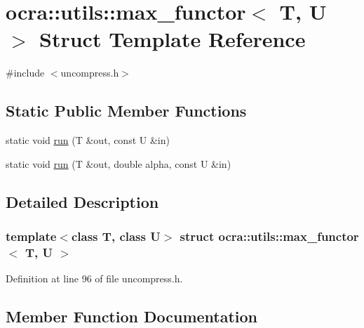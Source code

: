 \hypertarget{structocra_1_1utils_1_1max__functor}{}\section{ocra\+:\+:utils\+:\+:max\+\_\+functor$<$ T, U $>$ Struct Template Reference}
\label{structocra_1_1utils_1_1max__functor}


{\ttfamily \#include $<$uncompress.\+h$>$}

\subsection*{Static Public Member Functions}
\begin{DoxyCompactItemize}
\item 
static void \hyperlink{structocra_1_1utils_1_1max__functor_a1d6157c0cc03c92588bb07ce92daed6e}{run} (T \&out, const U \&in)
\item 
static void \hyperlink{structocra_1_1utils_1_1max__functor_ac1069592ea09b6f4eafd87704d018afa}{run} (T \&out, double alpha, const U \&in)
\end{DoxyCompactItemize}


\subsection{Detailed Description}
\subsubsection*{template$<$class T, class U$>$\newline
struct ocra\+::utils\+::max\+\_\+functor$<$ T, U $>$}



Definition at line 96 of file uncompress.\+h.



\subsection{Member Function Documentation}
\hypertarget{structocra_1_1utils_1_1max__functor_a1d6157c0cc03c92588bb07ce92daed6e}{}\label{structocra_1_1utils_1_1max__functor_a1d6157c0cc03c92588bb07ce92daed6e} 
